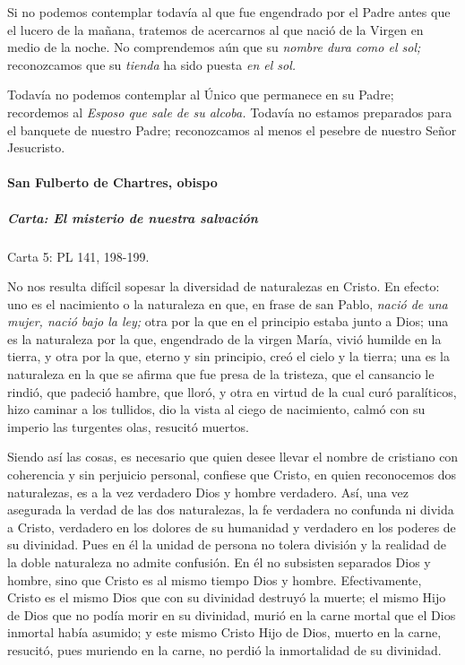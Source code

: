 \documentclass[]{article}
\let\oldparagraph\paragraph
\renewcommand{\paragraph}[1]{\oldparagraph{#1}\mbox{}}
\let\oldsubparagraph\subparagraph
\renewcommand{\subparagraph}[1]{\oldsubparagraph{#1}\mbox{}}
\begin{document}
Si no podemos contemplar todavía al que fue engendrado por el Padre
antes que el lucero de la mañana, tratemos de acercarnos al que nació de
la Virgen en medio de la noche. No comprendemos aún que su \emph{nombre
dura como el sol;} reconozcamos que su \emph{tienda} ha sido puesta
\emph{en el sol.}

Todavía no podemos contemplar al Único que permanece en su Padre;
recordemos al \emph{Esposo que sale de su alcoba.} Todavía no estamos
preparados para el banquete de nuestro Padre; reconozcamos al menos el
pesebre de nuestro Señor Jesucristo.

\paragraph{San Fulberto de Chartres,
obispo}\label{san-fulberto-de-chartres-obispo}

\subparagraph{Carta: El misterio de nuestra
salvación}\label{carta-el-misterio-de-nuestra-salvaciuxf3n}

Carta 5: PL 141, 198-199.

No nos resulta difícil sopesar la diversidad de naturalezas en Cristo.
En efecto: uno es el nacimiento o la naturaleza en que, en frase de san
Pablo, \emph{nació de una mujer, nació bajo la ley;} otra por la que en
el principio estaba junto a Dios; una es la naturaleza por la que,
engendrado de la virgen María, vivió humilde en la tierra, y otra por la
que, eterno y sin principio, creó el cielo y la tierra; una es la
naturaleza en la que se afirma que fue presa de la tristeza, que el
cansancio le rindió, que padeció hambre, que lloró, y otra en virtud de
la cual curó paralíticos, hizo caminar a los tullidos, dio la vista al
ciego de nacimiento, calmó con su imperio las turgentes olas, resucitó
muertos.

Siendo así las cosas, es necesario que quien desee llevar el nombre de
cristiano con coherencia y sin perjuicio personal, confiese que Cristo,
en quien reconocemos dos naturalezas, es a la vez verdadero Dios y
hombre verdadero. Así, una vez asegurada la verdad de las dos
naturalezas, la fe verdadera no confunda ni divida a Cristo, verdadero
en los dolores de su humanidad y verdadero en los poderes de su
divinidad. Pues en él la unidad de persona no tolera división y la
realidad de la doble naturaleza no admite confusión. En él no subsisten
separados Dios y hombre, sino que Cristo es al mismo tiempo Dios y
hombre. Efectivamente, Cristo es el mismo Dios que con su divinidad
destruyó la muerte; el mismo Hijo de Dios que no podía morir en su
divinidad, murió en la carne mortal que el Dios inmortal había asumido;
y este mismo Cristo Hijo de Dios, muerto en la carne, resucitó, pues
muriendo en la carne, no perdió la inmortalidad de su divinidad.
\end{document}
